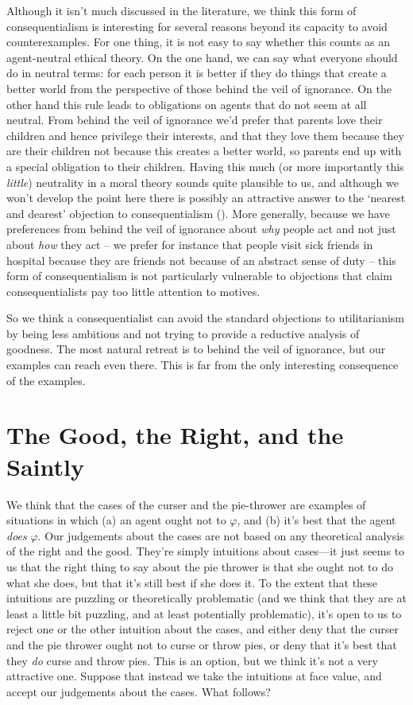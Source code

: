 \documentclass[
  10pt,
  letterpaper,
  DIV=11,
  numbers=noendperiod,
  twoside]{scrartcl}
\begin{document}
Although it isn't much discussed in the literature, we think this form
of consequentialism is interesting for several reasons beyond its
capacity to avoid counterexamples. For one thing, it is not easy to say
whether this counts as an agent-neutral ethical theory. On the one hand,
we can say what everyone should do in neutral terms: for each person it
is better if they do things that create a better world from the
perspective of those behind the veil of ignorance. On the other hand
this rule leads to obligations on agents that do not seem at all
neutral. From behind the veil of ignorance we'd prefer that parents love
their children and hence privilege their interests, and that they love
them because they are their children not because this creates a better
world, so parents end up with a special obligation to their children.
Having this much (or more importantly this \emph{little}) neutrality in
a moral theory sounds quite plausible to us, and although we won't
develop the point here there is possibly an attractive answer to the
`nearest and dearest' objection to consequentialism
(). More generally, because we
have preferences from behind the veil of ignorance about \emph{why}
people act and not just about \emph{how} they act -- we prefer for
instance that people visit sick friends in hospital because they are
friends not because of an abstract sense of duty -- this form of
consequentialism is not particularly vulnerable to objections that claim
consequentialists pay too little attention to motives.

So we think a consequentialist can avoid the standard objections to
utilitarianism by being less ambitious and not trying to provide a
reductive analysis of goodness. The most natural retreat is to behind
the veil of ignorance, but our examples can reach even there. This is
far from the only interesting consequence of the examples.

\section{The Good, the Right, and the
Saintly}\label{the-good-the-right-and-the-saintly}

We think that the cases of the curser and the pie-thrower are examples
of situations in which (a) an agent ought not to \(\varphi\), and (b)
it's best that the agent \emph{does} \(\varphi\). Our judgements about
the cases are not based on any theoretical analysis of the right and the
good. They're simply intuitions about cases---it just seems to us that
the right thing to say about the pie thrower is that she ought not to do
what she does, but that it's still best if she does it. To the extent
that these intuitions are puzzling or theoretically problematic (and we
think that they are at least a little bit puzzling, and at least
potentially problematic), it's open to us to reject one or the other
intuition about the cases, and either deny that the curser and the pie
thrower ought not to curse or throw pies, or deny that it's best that
they \emph{do} curse and throw pies. This is an option, but we think
it's not a very attractive one. Suppose that instead we take the
intuitions at face value, and accept our judgements about the cases.
What follows?
\end{document}

